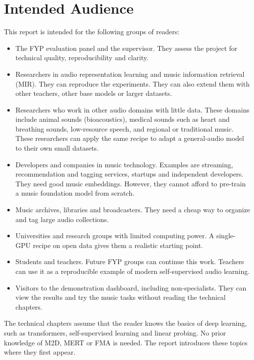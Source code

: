 \documentclass{FastFyp}
\begin{document}
\section{Intended Audience}
\label{sec:intro-audience}
This report is intended for the following groups of readers:
\begin{itemize}
  \item The FYP evaluation panel and the supervisor. They assess the project for technical quality, reproducibility and clarity.
  \item Researchers in audio representation learning and music information retrieval (MIR). They can reproduce the experiments. They can also extend them with other teachers, other base models or larger datasets.
  \item Researchers who work in other audio domains with little data. These domains include animal sounds (bioacoustics), medical sounds such as heart and breathing sounds, low-resource speech, and regional or traditional music. These researchers can apply the same recipe to adapt a general-audio model to their own small datasets.
  \item Developers and companies in music technology. Examples are streaming, recommendation and tagging services, startups and independent developers. They need good music embeddings. However, they cannot afford to pre-train a music foundation model from scratch.
  \item Music archives, libraries and broadcasters. They need a cheap way to organize and tag large audio collections.
  \item Universities and research groups with limited computing power. A single-GPU recipe on open data gives them a realistic starting point.
  \item Students and teachers. Future FYP groups can continue this work. Teachers can use it as a reproducible example of modern self-supervised audio learning.
  \item Visitors to the demonstration dashboard, including non-specialists. They can view the results and try the music tasks without reading the technical chapters.
\end{itemize}
The technical chapters assume that the reader knows the basics of deep learning, such as transformers, self-supervised learning and linear probing. No prior knowledge of M2D, MERT or FMA is needed. The report introduces these topics where they first appear.
\end{document}
